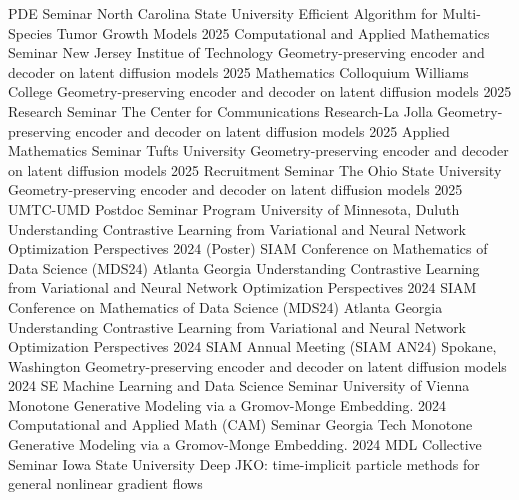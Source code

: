 \begin{cvtalks}
    \cvtalk
    {PDE Seminar} %
    {North Carolina State University}
    {Efficient Algorithm for Multi-Species Tumor Growth Models} %
    {2025} %
\cvtalk
    {Computational and Applied Mathematics Seminar} %
    {New Jersey Institue of Technology}
    {Geometry-preserving encoder and decoder on latent diffusion models} %
    {2025} %
\cvtalk
    {Mathematics Colloquium} %
    {Williams College}
    {Geometry-preserving encoder and decoder on latent diffusion models} %
    {2025} %
\cvtalk
    {Research Seminar} %
    {The Center for Communications Research-La Jolla}
    {Geometry-preserving encoder and decoder on latent diffusion models} %
    {2025} %
\cvtalk
    {Applied Mathematics Seminar} %
    {Tufts University}
    {Geometry-preserving encoder and decoder on latent diffusion models} %
    {2025} %
\cvtalk
    {Recruitment Seminar} %
    {The Ohio State University}
    {Geometry-preserving encoder and decoder on latent diffusion models} %
    {2025} %
\cvtalk
    {UMTC-UMD Postdoc Seminar Program} %
    {University of Minnesota, Duluth}
    {Understanding Contrastive Learning from Variational and Neural Network Optimization Perspectives} %
    {2024} %
\cvtalk
    {(Poster) SIAM Conference on Mathematics of Data Science (MDS24)} %
    {Atlanta Georgia}
    {Understanding Contrastive Learning from Variational and Neural Network Optimization Perspectives} %
    {2024} %
\cvtalk
    {SIAM Conference on Mathematics of Data Science (MDS24)} %
    {Atlanta Georgia}
    { Understanding Contrastive Learning from Variational and Neural Network Optimization Perspectives} %
    {2024} %
\cvtalk
    {SIAM Annual Meeting (SIAM AN24)} %
    {Spokane, Washington}
    {Geometry-preserving encoder and decoder on latent diffusion models} %
    {2024} %
  \cvtalk
    {SE Machine Learning and Data Science Seminar} %
    {University of Vienna}
    {Monotone Generative Modeling via a Gromov-Monge Embedding.} %
    {2024} %
\cvtalk
    {Computational and Applied Math (CAM) Seminar} %
    {Georgia Tech}
    {Monotone Generative Modeling via a Gromov-Monge Embedding.} %
    {2024} %
\cvtalk
    {MDL Collective Seminar}
    {Iowa State University}
    {Deep JKO: time-implicit particle methods for general nonlinear gradient flows}

\end{cvtalks}
